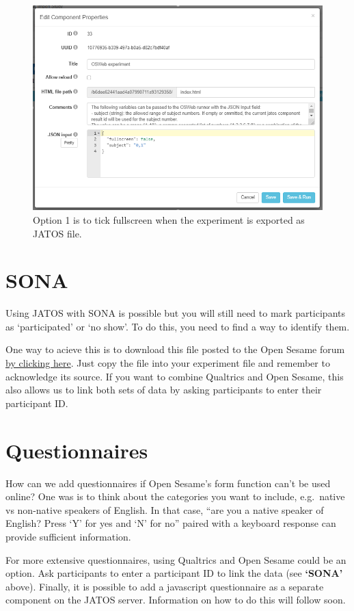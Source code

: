 \documentclass[
]{book}
\begin{document}
\begin{figure}

{\centering \includegraphics[width=0.99\linewidth]{images/opensesame/fullscreen2} 

}

\caption{Option 1 is to tick fullscreen when the experiment is exported as JATOS file.}\label{fig:Figure13-3}
\end{figure}

\hypertarget{sona}{%
\section{SONA}\label{sona}}

Using JATOS with SONA is possible but you will still need to mark participants as `participated' or `no show'. To do this, you need to find a way to identify them.

One way to acieve this is to download this file posted to the Open Sesame forum \href{https://forum.cogsci.nl/discussion/5876/}{by clicking here}. Just copy the file into your experiment file and remember to acknowledge its source. If you want to combine Qualtrics and Open Sesame, this also allows us to link both sets of data by asking participants to enter their participant ID.

\hypertarget{questionnaires}{%
\section{Questionnaires}\label{questionnaires}}

How can we add questionnaires if Open Sesame's form function can't be used online? One was is to think about the categories you want to include, e.g.~native vs non-native speakers of English. In that case, ``are you a native speaker of English? Press `Y' for yes and `N' for no'' paired with a keyboard response can provide sufficient information.

For more extensive questionnaires, using Qualtrics and Open Sesame could be an option. Ask participants to enter a participant ID to link the data (see \textbf{`SONA'} above). Finally, it is possible to add a javascript questionnaire as a separate component on the JATOS server. Information on how to do this will follow soon.
\end{document}
